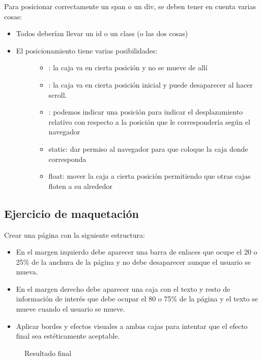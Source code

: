 \documentclass[letterpaper,10pt,spanish]{sphinxmanual}
\begin{document}
Para posicionar correctamente un span o un div, se deben tener en cuenta
varias cosas:
\begin{itemize}
\item {} 
Todos deberían llevar un id o un class (o las dos cosas)

\item {} \begin{description}
\item[{El posicionamiento tiene varias posibilidades:}] \leavevmode\begin{itemize}
\item {} 
: la caja va en cierta posición y no se mueve de allí

\item {} 
: la caja va en cierta posición inicial y puede desaparecer al hacer scroll.

\item {} 
: podemos indicar una posición para indicar el desplazamiento relativo con respecto a la posición que le correspondería según el navegador

\item {} 
static: dar permiso al navegador para que coloque la caja donde corresponda

\item {} 
float: mover la caja a cierta posición permitiendo que otras cajas floten a su alrededor

\end{itemize}

\end{description}

\end{itemize}


\subsection{Ejercicio de maquetación}
\label{tema3:ejercicio-de-maquetacion}
Crear una página con la siguiente estructura:
\begin{itemize}
\item {} 
En el margen izquierdo debe aparecer una barra de enlaces que ocupe el 20 o 25\% de la anchura de la página y no debe desaparecer aunque el usuario se mueva.

\item {} 
En el margen derecho debe aparecer una caja con el texto y resto de información de interés que debe ocupar el 80 o 75\% de la página y el texto se mueve cuando el usuario se mueve.

\item {} 
Aplicar bordes y efectos visuales a ambas cajas para intentar que el efecto final sea estéticamente aceptable.

\end{itemize}
\begin{figure}[htbp]
\centering
\capstart

\noindent{}
\caption{Resultado final}\label{tema3:id8}\end{figure}
\end{document}
